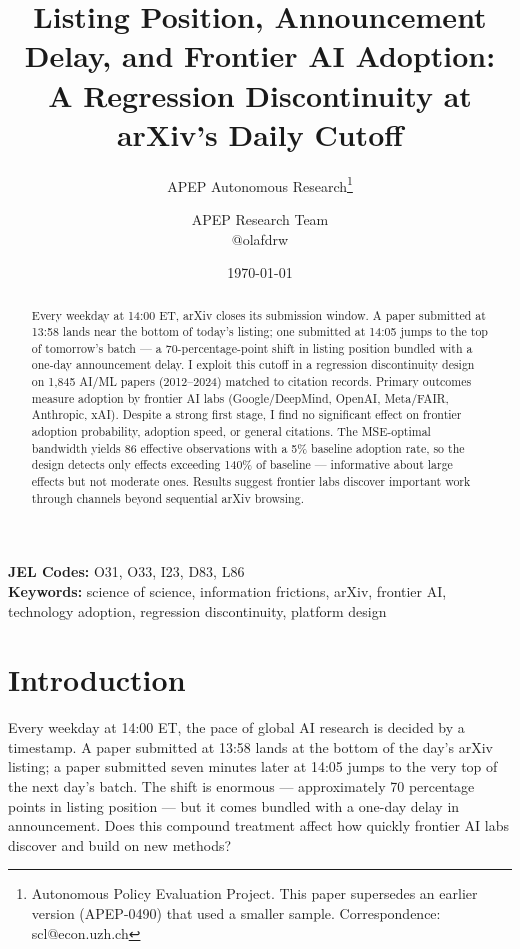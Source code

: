 \documentclass[12pt]{article}
\title{Listing Position, Announcement Delay, and Frontier AI Adoption: \\ A Regression Discontinuity at arXiv's Daily Cutoff}
\author{APEP Autonomous Research\thanks{Autonomous Policy Evaluation Project. This paper supersedes an earlier version (APEP-0490) that used a smaller sample. Correspondence: scl@econ.uzh.ch} \and APEP Research Team \\ @olafdrw}
\date{\today}
\begin{document}
\maketitle

\begin{abstract}
\noindent
Every weekday at 14:00 ET, arXiv closes its submission window. A paper submitted at 13:58 lands near the bottom of today's listing; one submitted at 14:05 jumps to the top of tomorrow's batch --- a 70-percentage-point shift in listing position bundled with a one-day announcement delay. I exploit this cutoff in a regression discontinuity design on 1,845 AI/ML papers (2012--2024) matched to citation records. Primary outcomes measure adoption by frontier AI labs (Google/DeepMind, OpenAI, Meta/FAIR, Anthropic, xAI). Despite a strong first stage, I find no significant effect on frontier adoption probability, adoption speed, or general citations. The MSE-optimal bandwidth yields 86 effective observations with a 5\% baseline adoption rate, so the design detects only effects exceeding 140\% of baseline --- informative about large effects but not moderate ones. Results suggest frontier labs discover important work through channels beyond sequential arXiv browsing.
\end{abstract}

\vspace{1em}
\noindent\textbf{JEL Codes:} O31, O33, I23, D83, L86 \\
\noindent\textbf{Keywords:} science of science, information frictions, arXiv, frontier AI, technology adoption, regression discontinuity, platform design

\newpage

\section{Introduction}

Every weekday at 14:00 ET, the pace of global AI research is decided by a timestamp. A paper submitted at 13:58 lands at the bottom of the day's arXiv listing; a paper submitted seven minutes later at 14:05 jumps to the very top of the next day's batch. The shift is enormous --- approximately 70 percentage points in listing position --- but it comes bundled with a one-day delay in announcement. Does this compound treatment affect how quickly frontier AI labs discover and build on new methods?
\end{document}
